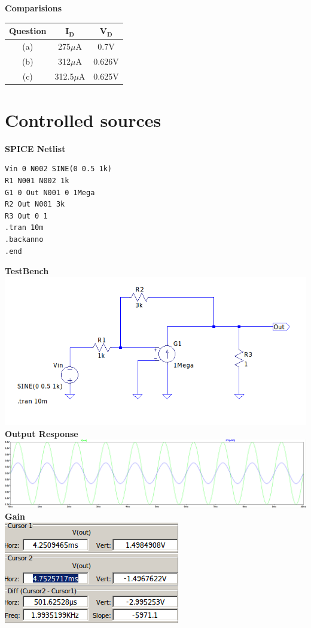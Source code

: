 \documentclass{article}
\begin{document}
 \newline
\textbf{Comparisions}\\
\begin{center}
\begin{tabular}{|c|c|c|}
\hline
\textbf{Question} & $\mathbf{I_D}$ & $\mathbf{V_D}$ \\
\hline
(a) & 275$\mu$A & 0.7V\\
\hline
(b) & 312$\mu$A & 0.626V\\
\hline
(c) & 312.5$\mu$A & 0.625V\\
\hline
\end{tabular}
\end{center}

\section{Controlled sources}
\textbf{SPICE Netlist}
\begin{lstlisting}
Vin 0 N002 SINE(0 0.5 1k)
R1 N001 N002 1k
G1 0 Out N001 0 1Mega
R2 Out N001 3k
R3 Out 0 1
.tran 10m
.backanno
.end
\end{lstlisting}
\textbf{TestBench}\\
\includegraphics[scale=0.5]{./figs/Q3_tb.png}\\
\textbf{Output Response}\\
\includegraphics[scale=0.28]{./figs/Q3_sr.png}\\
\textbf{Gain}\\
\includegraphics[scale=0.5]{./figs/Q3_re.png}\\
\end{document}
